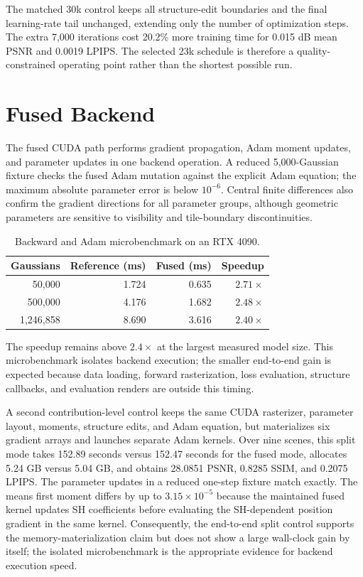 The matched 30k control keeps all structure-edit boundaries and the final
learning-rate tail unchanged, extending only the number of optimization
steps. The extra 7,000 iterations cost 20.2\% more training time for 0.015 dB
mean PSNR and 0.0019 LPIPS. The selected 23k schedule is therefore a
quality-constrained operating point rather than the shortest possible run.

\section{Fused Backend}

The fused CUDA path performs gradient propagation, Adam moment updates, and
parameter updates in one backend operation. A reduced 5,000-Gaussian fixture
checks the fused Adam mutation against the explicit Adam equation; the maximum
absolute parameter error is below $10^{-6}$. Central finite differences also
confirm the gradient directions for all parameter groups, although geometric
parameters are sensitive to visibility and tile-boundary discontinuities.

\begin{table}[H]
\centering
\caption{Backward and Adam microbenchmark on an RTX 4090.}
\label{tab:fused-backend}
\begin{tabular}{rrrr}
\toprule
Gaussians & Reference (ms) & Fused (ms) & Speedup \\
\midrule
50,000 & 1.724 & 0.635 & $2.71\times$ \\
500,000 & 4.176 & 1.682 & $2.48\times$ \\
1,246,858 & 8.690 & 3.616 & $2.40\times$ \\
\bottomrule
\end{tabular}
\end{table}

The speedup remains above $2.4\times$ at the largest measured model size. This
microbenchmark isolates backend execution; the smaller end-to-end gain is
expected because data loading, forward rasterization, loss evaluation,
structure callbacks, and evaluation renders are outside this timing.

A second contribution-level control keeps the same CUDA rasterizer, parameter
layout, moments, structure edits, and Adam equation, but materializes six
gradient arrays and launches separate Adam kernels. Over nine scenes, this
split mode takes 152.89 seconds versus 152.47 seconds for the fused mode,
allocates 5.24 GB versus 5.04 GB, and obtains 28.0851 PSNR, 0.8285 SSIM, and
0.2075 LPIPS. The parameter updates in a reduced one-step fixture match
exactly. The means first moment differs by up to $3.15\times10^{-5}$ because
the maintained fused kernel updates SH coefficients before evaluating the
SH-dependent position gradient in the same kernel. Consequently, the
end-to-end split control supports the memory-materialization claim but does
not show a large wall-clock gain by itself; the isolated microbenchmark is the
appropriate evidence for backend execution speed.

